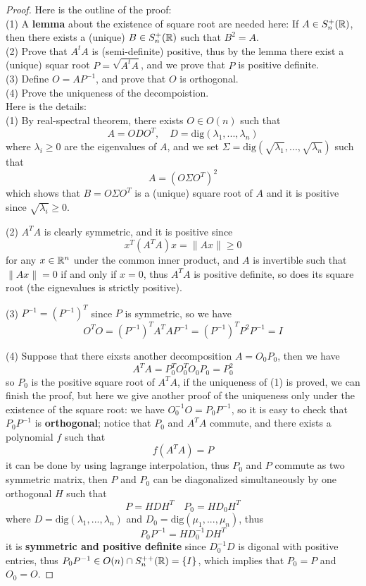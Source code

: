 \begin{proof}
    Here is the outline of the proof:\\
    (1) A \textbf{lemma} about the existence of square root are needed here: If \(A \in S^+_n(\mathbb{R})\), then there exists a (unique) \(B \in S^+_n(\mathbb{R})\) such that \(B^2 = A\). \\
    (2) Prove that \(A^tA\) is (semi-definite) positive, thus by the lemma there exist a (unique) squar root \(P = \sqrt{A^tA}\), and we prove that \(P\) is positive definite. \\
    (3) Define \(O = AP^{-1}\), and prove that \(O\) is orthogonal.\\
    (4) Prove the uniqueness of the decompoistion.\\

    Here is the details:\\
    (1) By real-spectral theorem, there exists \(O \in O(n)\) such that
    \[A = ODO^T, \quad D = \mathrm{dig}(\lambda_1,...,\lambda_n)\]
    where \(\lambda_i \geq 0\) are the eigenvalues of \(A\), and we set \(\Sigma = \mathrm{dig}(\sqrt{\lambda_1},...,\sqrt{\lambda_n})\) such that
    \[A = (O\Sigma O^T)^2\]
    which shows that \(B = O \Sigma O^T\) is a (unique) square root of \(A\) and it is positive since \(\sqrt{\lambda_i} \geq 0\). 

    (2) \(A^T A\) is clearly symmetric, and it is positive since
    \[x^T (A^T A) x = \|Ax\| \geq 0\]
    for any \(x \in \mathbb{R}^n\) under the common inner product, and \(A\) is invertible such that \(\|Ax\| = 0\) if and only if \(x = 0\), thus \(A^TA\) is positive definite, so does its square root (the eignevalues is strictly positive).

    (3) \(P^{-1} = (P^{-1})^T\) since \(P\) is symmetric, so we have
    \[O^T O = (P^{-1})^T A^T A P^{-1} = (P^{-1})^T P^2 P^{-1} = I\]

    (4) Suppose that there eixsts another decomposition \(A = O_0P_0\), then we have
    \[A^TA = P_0^T O_0^T O_0 P_0 = P_0^2\]
    so \(P_0\) is the positive square root of \(A^TA\), if the uniqueness of (1) is proved, we can finish the proof, but here we give another proof of the uniqueness only under the existence of the square root: we have \(O_0^{-1}O = P_0P^{-1}\), so it is easy to check that \(P_0P^{-1}\) is \textbf{orthogonal}; notice that \(P_0\) and \(A^TA\) commute, and there exists a polynomial \(f\) such that
    \[f(A^TA) = P\]
    it can be done by using lagrange interpolation, thus \(P_0\) and \(P\) commute as two symmetric matrix, then \(P\) and \(P_0\) can be diagonalized simultaneously by one orthogonal \(H\) such that
    \[P = HDH^T \quad P_0 = H D_0 H^T\]
    where \(D = \mathrm{dig}(\lambda_1,...,\lambda_n)\) and \(D_0 = \mathrm{dig}(\mu_1,...,\mu_n)\), thus
    \[P_0P^{-1} = HD_0^{-1}DH^T\]
    it is \textbf{symmetric and positive definite} since \(D^{-1}_0 D\) is digonal with positive entries, thus \(P_0P^{-1} \in O(n) \cap S^{++}_n(\mathbb{R}) = \{I\}\), which implies that \(P_0 = P\) and \(O_0 = O\).
\end{proof}

